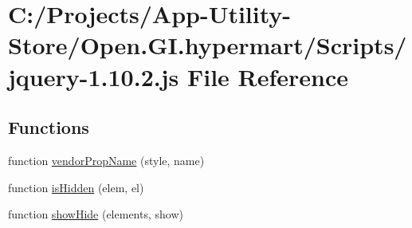 \hypertarget{_scripts_2jquery-1_810_82_8js}{}\section{C\+:/\+Projects/\+App-\/\+Utility-\/\+Store/\+Open.G\+I.\+hypermart/\+Scripts/jquery-\/1.10.2.js File Reference}
\label{_scripts_2jquery-1_810_82_8js}
\subsection*{Functions}
\begin{DoxyCompactItemize}
\item 
function \hyperlink{_scripts_2jquery-1_810_82_8js_a6a111234d6e26ce833f8fabd50819b7a}{vendor\+Prop\+Name} (style, name)
\item 
function \hyperlink{_scripts_2jquery-1_810_82_8js_a67ed58d688ff11991ca2826ebfbf28a4}{is\+Hidden} (elem, el)
\item 
function \hyperlink{_scripts_2jquery-1_810_82_8js_a002b8e481f3ab2a83194366aceb7a706}{show\+Hide} (elements, show)
\item 

\end{DoxyCompactItemize}
